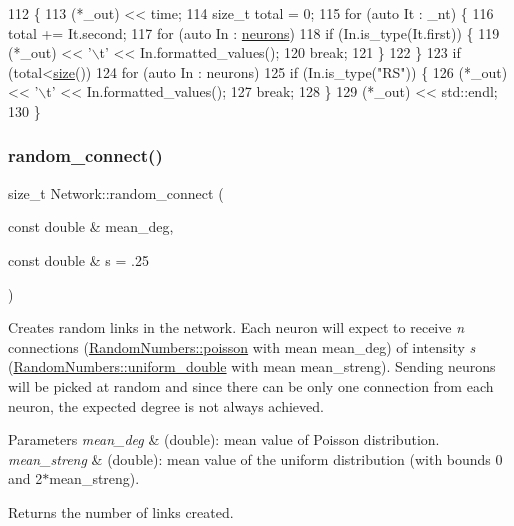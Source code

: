 \begin{DoxyCode}
112                                            \{
113     (*\_out)  << time;
114     \textcolor{keywordtype}{size\_t} total = 0;
115     \textcolor{keywordflow}{for} (\textcolor{keyword}{auto} It : \_nt) \{
116         total += It.second;
117         \textcolor{keywordflow}{for} (\textcolor{keyword}{auto} In : \hyperlink{classNetwork_a1b7832bc2c7b8855cdc3b2d6329eff9d}{neurons}) 
118             \textcolor{keywordflow}{if} (In.is\_type(It.first)) \{
119                 (*\_out) << \textcolor{charliteral}{'\(\backslash\)t'} << In.formatted\_values();
120                 \textcolor{keywordflow}{break};
121             \}
122     \}
123     \textcolor{keywordflow}{if} (total<\hyperlink{classNetwork_a41c54d12d861883170b5c5abca3a7bc8}{size}())
124         \textcolor{keywordflow}{for} (\textcolor{keyword}{auto} In : neurons) 
125             \textcolor{keywordflow}{if} (In.is\_type(\textcolor{stringliteral}{"RS"})) \{
126                 (*\_out) << \textcolor{charliteral}{'\(\backslash\)t'} << In.formatted\_values();
127                 \textcolor{keywordflow}{break};
128             \}
129     (*\_out) << std::endl;
130 \}
\end{DoxyCode}
\mbox{\label{classNetwork_a681d8f731ce258376a20f9bf062b943b}} 
\subsubsection{\texorpdfstring{random\+\_\+connect()}{random\_connect()}}
{\footnotesize\ttfamily size\+\_\+t Network\+::random\+\_\+connect (\begin{DoxyParamCaption}\item[{const double \&}]{mean\+\_\+deg,  }\item[{const double \&}]{s = {\ttfamily .25} }\end{DoxyParamCaption})}

Creates random links in the network. Each neuron will expect to receive {\itshape n} connections (\hyperlink{classRandomNumbers_a69e33058b8a923f9597cf13421d5fcd4}{Random\+Numbers\+::poisson} with mean {\ttfamily mean\+\_\+deg}) of intensity {\itshape s} (\hyperlink{classRandomNumbers_ae226c129494f9055ac37ed1af943d010}{Random\+Numbers\+::uniform\+\_\+double} with mean {\ttfamily mean\+\_\+streng}). Sending neurons will be picked at random and since there can be only one connection from each neuron, the expected degree is not always achieved. 
\begin{DoxyParams}{Parameters}
{\em mean\+\_\+deg} & (double)\+: mean value of Poisson distribution. \\
\hline
{\em mean\+\_\+streng} & (double)\+: mean value of the uniform distribution (with bounds 0 and 2$\ast$mean\+\_\+streng). \\
\hline
\end{DoxyParams}
\begin{DoxyReturn}{Returns}
the number of links created. 
\end{DoxyReturn}

